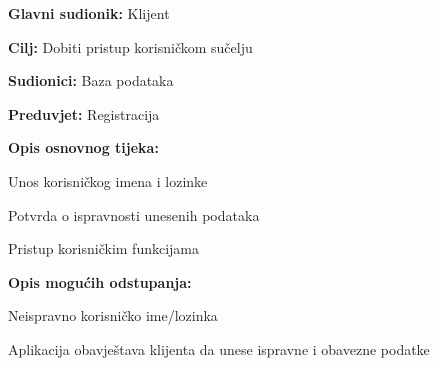 										\noindent {}
					\begin{packed_item}
	
						\item \textbf{Glavni sudionik: }Klijent
						\item  \textbf{Cilj:} Dobiti pristup korisničkom sučelju
						\item  \textbf{Sudionici:} Baza podataka
						\item  \textbf{Preduvjet:} Registracija
						\item  \textbf{Opis osnovnog tijeka:						
						}
						
						\item[] \begin{packed_enum}
	
							\item Unos korisničkog imena i lozinke
							\item Potvrda o ispravnosti unesenih podataka
							\item Pristup korisničkim funkcijama
							
						\end{packed_enum}
						
						\item  \textbf{Opis mogućih odstupanja:}
						
						\item[] \begin{packed_item}
	
							\item[2.a] Neispravno korisničko ime/lozinka
							\item[] \begin{packed_enum}
								
								\item Aplikacija obavještava klijenta da unese ispravne i obavezne podatke
																
							\end{packed_enum}
														
						\end{packed_item}
					\end{packed_item}

